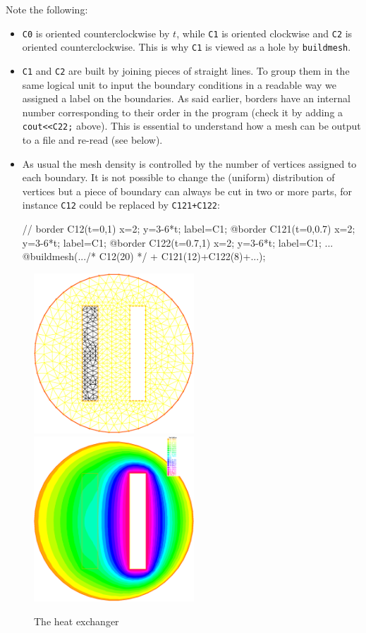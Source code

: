 \documentclass[a4paper,twoside,12pt]{book}
\def\x#1{#1\index{#1}}%
\begin{document}
Note the following:
\begin{itemize}
\item \texttt{C0} is oriented counterclockwise by $t$, while   \texttt{C1} is oriented clockwise
     and \texttt{C2} is oriented counterclockwise.
    This is why \texttt{C1} is viewed as a hole by {\tt buildmesh}.
%
\item \texttt{C1} and \texttt{C2} are built by joining pieces of straight lines.  To group them in the
    same logical unit to input the boundary conditions in a readable way we
    assigned a \x{label on the boundaries}.  As said earlier, borders
    have an internal number corresponding to their order in the program (check it by
    adding a {\tt cout<<C22;} above). This is essential to understand how a mesh can be
    output to a file and re-read (see below).
%
\item As usual the mesh density is controlled by the number of vertices assigned to each
    boundary. It is not possible to change the (uniform) distribution of vertices but a
    piece of boundary can always be cut in two or more parts, for instance \texttt{C12} could be
    replaced by \texttt{C121+C122}:

\bFF
 //    border C12(t=0,1){ x=2;    y=3-6*t;   label=C1;}
    @border C121(t=0,0.7){ x=2;    y=3-6*t;  label=C1;}
    @border C122(t=0.7,1){ x=2;    y=3-6*t;  label=C1;}
    ... @buildmesh(.../* C12(20) */ + C121(12)+C122(8)+...);
\eFF
\end{itemize}

\begin{figure}[htbp]
\begin{center}
\includegraphics[width=6cm]{heatexTh}~~~
\includegraphics[width=6cm]{heatex}
\caption{\label{figheatex} The heat exchanger}
\end{center}
\end{figure}
\end{document}
